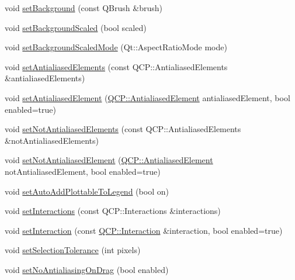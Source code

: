 \begin{DoxyCompactItemize}
\item 
void \mbox{\hyperlink{class_q_custom_plot_a8ed256cf467bfa7ba1f9feaae62c3bd0}{set\+Background}} (const Q\+Brush \&brush)
\item 
void \mbox{\hyperlink{class_q_custom_plot_a36f0fa1317325dc7b7efea615ee2de1f}{set\+Background\+Scaled}} (bool scaled)
\item 
void \mbox{\hyperlink{class_q_custom_plot_a4c0eb4865b7949f62e1cb97db04a3de0}{set\+Background\+Scaled\+Mode}} (Qt\+::\+Aspect\+Ratio\+Mode mode)
\item 
void \mbox{\hyperlink{class_q_custom_plot_af6f91e5eab1be85f67c556e98c3745e8}{set\+Antialiased\+Elements}} (const Q\+C\+P\+::\+Antialiased\+Elements \&antialiased\+Elements)
\item 
void \mbox{\hyperlink{class_q_custom_plot_aeef813bcf7efab8e765f9f87ec454691}{set\+Antialiased\+Element}} (\mbox{\hyperlink{namespace_q_c_p_ae55dbe315d41fe80f29ba88100843a0c}{Q\+C\+P\+::\+Antialiased\+Element}} antialiased\+Element, bool enabled=true)
\item 
void \mbox{\hyperlink{class_q_custom_plot_ae10d685b5eabea2999fb8775ca173c24}{set\+Not\+Antialiased\+Elements}} (const Q\+C\+P\+::\+Antialiased\+Elements \&not\+Antialiased\+Elements)
\item 
void \mbox{\hyperlink{class_q_custom_plot_afc657938a707c890e449ae89203a076d}{set\+Not\+Antialiased\+Element}} (\mbox{\hyperlink{namespace_q_c_p_ae55dbe315d41fe80f29ba88100843a0c}{Q\+C\+P\+::\+Antialiased\+Element}} not\+Antialiased\+Element, bool enabled=true)
\item 
void \mbox{\hyperlink{class_q_custom_plot_ad8858410c2db47b7104040a3aa61c3fc}{set\+Auto\+Add\+Plottable\+To\+Legend}} (bool on)
\item 
void \mbox{\hyperlink{class_q_custom_plot_a5ee1e2f6ae27419deca53e75907c27e5}{set\+Interactions}} (const Q\+C\+P\+::\+Interactions \&interactions)
\item 
void \mbox{\hyperlink{class_q_custom_plot_a422bf1bc6d56dac75a3d805d9a65902c}{set\+Interaction}} (const \mbox{\hyperlink{namespace_q_c_p_a2ad6bb6281c7c2d593d4277b44c2b037}{Q\+C\+P\+::\+Interaction}} \&interaction, bool enabled=true)
\item 
void \mbox{\hyperlink{class_q_custom_plot_a4dc31241d7b09680950e19e5f971ed93}{set\+Selection\+Tolerance}} (int pixels)
\item 
void \mbox{\hyperlink{class_q_custom_plot_a775bdcb6329d44701aeaa6135b0e5265}{set\+No\+Antialiasing\+On\+Drag}} (bool enabled)
\item 

\end{DoxyCompactItemize}
